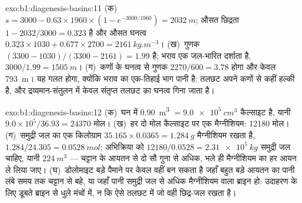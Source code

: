 \begin{solution}{exo:b1:diagenesis-basins:11}
(क)~$s = 3000 - 0.63\times1960\times(1 - e^{-3000/1960}) = \qty{2032}{m}$; औसत
छिद्रता $1 - 2032/3000 = \num{0.323}$ है और औसत घनत्व
$0.323\times1030 + 0.677\times2700 = \qty{2161}{kg.m^{-3}}$। (ख)~गुणक
$(3300 - 1030)/(3300 - 2161) = \num{1.99}$ है; भराव एक जल-भारित  दर्शाता है,
$3000/1.99 = \qty{1505}{m}$। (ग)~कणों के घनत्व से गुणक $2270/600 = \num{3.78}$ होगा
और  केवल \qty{793}{m}। यह गलत होगा, क्योंकि भराव का एक-तिहाई भाग पानी है:
तलछट अपने कणों से कहीं हल्की है, और द्रव्यमान-संतुलन में केवल संतृप्त तलछट का
घनत्व गिना जाता है।
\end{solution}

\begin{solution}{exo:b1:diagenesis-basins:12}
(क)~घन में \qty{0.90}{m^3} $= \qty{9.0e5}{cm^3}$ कैल्साइट है, यानी
$9.0\times10^5/36.93 = \num{24370}$ मोल। (ख)~हर दो मोल कैल्साइट पर एक मैग्नीशियम:
\num{12180} मोल। (ग)~समुद्री जल का एक किलोग्राम $35.165\times0.0365 =
\qty{1.284}{g}$ मैग्नीशियम रखता है, $1.284/24.305 = \qty{0.0528}{mol}$; अभिक्रिया को
$12180/0.0528 = \qty{2.31e5}{kg}$ समुद्री जल चाहिए, यानी $\qty{224}{m^3}$ ---
चट्टान के आयतन से दो सौ गुना से अधिक, भले ही मैग्नीशियम का हर आयन ले लिया जाए।
(घ)~डोलोमाइट बड़े पैमाने पर केवल वहीं बन सकता है जहाँ बहुत बड़े आयतन का पानी
लंबे समय तक चट्टान से बहे, या जहाँ पानी समुद्री जल से अधिक मैग्नीशियम वाला
ब्राइन हो: उदाहरण के लिए डूबते ब्राइन से धुले मंचों में, न कि ऐसे तलछट में जो
वही छिद्र-जल रखता है।
\end{solution}

